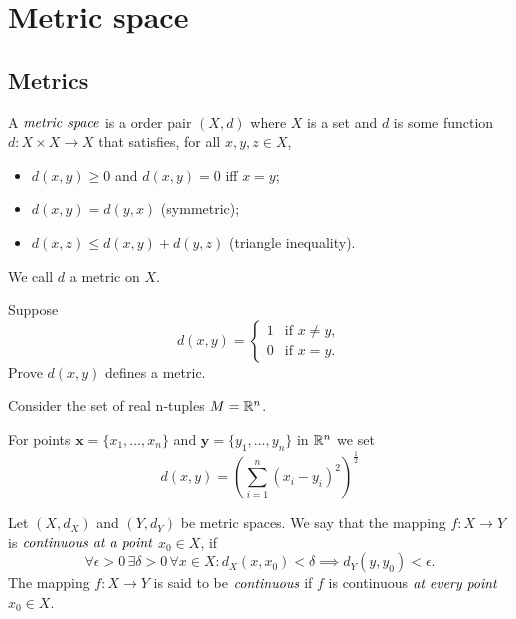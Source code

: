
\section{Metric space} %
\label{sec:metricspace}

\subsection{Metrics}

\begin{defn}
	A $\emph{metric space}$ is a order pair $(X,d)$
	where $X$ is a set and $d$ is some function
	$d: X \times X \to X$ that satisfies, for all
	$x,y,z \in X$,
	\begin{itemize}
		\item $d(x,y) \geq 0$ and $d(x,y)=0$ iff $x=y$;
		\item $d(x,y)=d(y,x)$ (symmetric);
		\item $d(x,z) \leq d(x,y) + d(y,z)$ (triangle inequality).
	\end{itemize}
	We call $d$ a metric on $X$.
\end{defn}

\begin{prob}
	Suppose
	\[
		d(x,y) =
		\begin{cases}
			1 & \text{if } x \neq y,\\
			0 & \text{if } x = y.
		\end{cases}
	\]
	Prove $d(x,y)$ defines a metric.
\end{prob}

\begin{exmp}
	Consider the set of real n-tuples $M=\mathbb{R}^n$.
	
	For points $\mathbf{x}=\{x_1,\dots,x_n\}$ and
	$\mathbf{y}=\{y_1,\dots,y_n\}$ in $\mathbb{R}^n$ we set
	\[
		d(x,y) = \left( \sum_{i=1}^{n} (x_i - y_i)^2 \right)^{\frac{1}{2}}
	\]
\end{exmp}

\begin{defn}[Continuity]
	Let $(X,d_{X})$ and $(Y,d_{Y})$ be metric spaces.
	We say that the mapping $f: X \to Y$ is
	$\emph{continuous at a point}$ $x_0 \in X$, if
	\[
		\forall \epsilon >0 \, \exists \delta >0 \,
		\forall x \in X : d_{X}(x,x_0) < \delta \implies
		d_{Y}(y,y_0) < \epsilon.
	\]
	The mapping $f: X \to Y$ is said to be $\emph{continuous}$
	if $f$ is continuous $\emph{at every point}$ $x_0 \in X$.
\end{defn}

